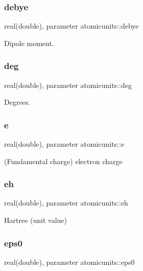 \subsubsection{\texorpdfstring{debye}{debye}}
{\footnotesize\ttfamily real(double), parameter atomicunits\+::debye}



Dipole moment. 

\mbox{\label{namespaceatomicunits_af9552fc54f3050b11cce6152261c2bf2}} 
\subsubsection{\texorpdfstring{deg}{deg}}
{\footnotesize\ttfamily real(double), parameter atomicunits\+::deg}



Degrees. 

\mbox{\label{namespaceatomicunits_af3650eaf423c8af5e887256a5e8023d6}} 
\subsubsection{\texorpdfstring{e}{e}}
{\footnotesize\ttfamily real(double), parameter atomicunits\+::e}



(Fundamental charge) electron charge 

\mbox{\label{namespaceatomicunits_a39b85d20ed96ab0b9dfb86c7646a61a0}} 
\subsubsection{\texorpdfstring{eh}{eh}}
{\footnotesize\ttfamily real(double), parameter atomicunits\+::eh}



Hartree (unit value) 

\mbox{\label{namespaceatomicunits_a45821c6127c356d71ba94bf34b962653}} 
\subsubsection{\texorpdfstring{eps0}{eps0}}
{\footnotesize\ttfamily real(double), parameter atomicunits\+::eps0}



